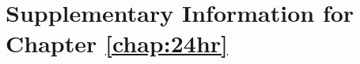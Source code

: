 \chapter{Supplementary Information for Chapter \ref{chap:24hr}}\label{app:24hr}

\graphicspath{{24hr/figures/}}


